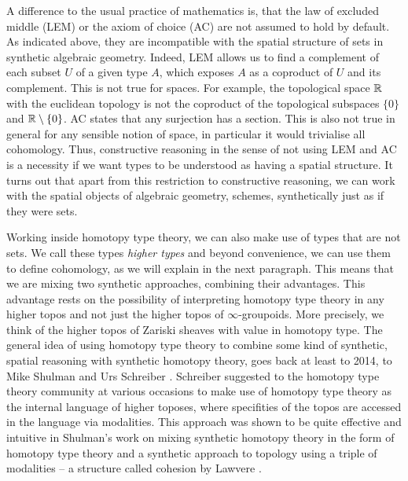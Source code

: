 A difference to the usual practice of mathematics is, that the law of excluded middle (LEM) or the axiom of choice (AC) are not assumed to hold by default. As indicated above, they are incompatible with the spatial structure of sets in synthetic algebraic geometry. Indeed, LEM allows us to find a complement of each subset $U$ of a given type $A$, which exposes $A$ as a coproduct of $U$ and its complement.
This is not true for spaces. For example, the topological space $\mathbb{R}$ with the euclidean topology is not the coproduct of the topological subspaces $\{0\}$ and $\mathbb{R}\setminus\{0\}$.
AC states that any surjection has a section. This is also not true in general for any sensible notion of space, in particular it would trivialise all cohomology.
Thus, constructive reasoning in the sense of not using LEM and AC is a necessity if we want types to be understood as having a spatial structure. It turns out that apart from this restriction to constructive reasoning, we can work with the spatial objects of algebraic geometry, schemes, synthetically just as if they were sets. 

Working inside homotopy type theory, we can also make use of types that are not sets. We call these types \emph{higher types} and beyond convenience, we can  use them to define cohomology, as we will explain in the next paragraph. This means that we are mixing two synthetic approaches, combining their advantages. This advantage rests on the possibility of interpreting homotopy type theory in any higher topos \cite{shulman2019all} and not just the higher topos of $\infty$-groupoids. More precisely, we think of the higher topos of Zariski sheaves with value in homotopy type. 
The general idea of using homotopy type theory to combine some kind of synthetic, spatial reasoning with synthetic homotopy theory, goes back at least to 2014, to Mike Shulman and Urs Schreiber \cite{Schreiber_2014}.
Schreiber suggested to the homotopy type theory community at various occasions to make use of homotopy type theory as the internal language of higher toposes, where specifities of the topos are accessed in the language via modalities.
This approach was shown to be quite effective and intuitive in Shulman's \cite{shulman-Brouwer-fixed-point} work on mixing synthetic homotopy theory in the form of homotopy type theory and a synthetic approach to topology using a triple of modalities -- a structure called cohesion by Lawvere \cite{Lawvere2007}. 

